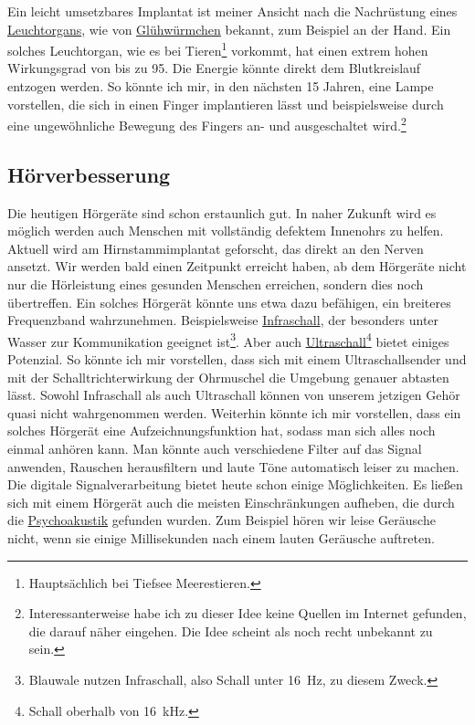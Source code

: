 Ein leicht umsetzbares Implantat ist meiner Ansicht nach die Nachrüstung eines
\href{http://de.wikipedia.org/wiki/Leuchtorgane}{Leuchtorgans}, wie von
\href{http://de.wikipedia.org/wiki/Leuchtkäfer}{Glühwürmchen} bekannt, zum Beispiel an der Hand. Ein
solches Leuchtorgan, wie es bei Tieren\footnote{Hauptsächlich bei Tiefsee Meerestieren.}
vorkommt, hat einen
extrem hohen Wirkungsgrad von bis zu 95\Prozent. Die Energie könnte direkt dem Blutkreislauf entzogen
werden. So könnte ich mir, in den nächsten 15 Jahren, eine Lampe
vorstellen, die sich in einen Finger implantieren lässt und beispielsweise durch eine ungewöhnliche
Bewegung des Fingers an- und ausgeschaltet wird.\footnote{Interessanterweise habe ich zu dieser Idee
keine Quellen im Internet gefunden, die darauf näher eingehen. Die Idee scheint als noch recht
unbekannt zu sein.}

\subsection{Hörverbesserung} %
\label{sec:Robin:future:hearing}
Die heutigen Hörgeräte sind schon erstaunlich gut.
In naher Zukunft wird es möglich werden auch Menschen mit vollständig defektem Innenohrs zu helfen.
Aktuell wird am Hirnstammimplantat geforscht, das direkt an den Nerven ansetzt.
Wir werden bald einen Zeitpunkt erreicht haben, ab dem Hörgeräte nicht nur die Hörleistung eines gesunden
Menschen erreichen, sondern dies noch übertreffen.
Ein solches Hörgerät könnte uns etwa dazu befähigen, ein breiteres Frequenzband
wahrzunehmen. Beispielsweise \href{http://de.wikipedia.org/wiki/Infraschall}{Infraschall}, der
besonders unter Wasser zur Kommunikation geeignet ist\footnote{Blauwale nutzen Infraschall, also
Schall unter \SI{16}{\hertz}, zu diesem Zweck.}. Aber auch
\href{http://de.wikipedia.org/wiki/Ultraschall}{Ultraschall}\footnote{Schall oberhalb von
\SI{16}{\kilo\hertz}.} bietet einiges Potenzial. So könnte ich mir vorstellen, dass sich mit einem
Ultraschallsender und mit der Schalltrichterwirkung der Ohrmuschel die Umgebung genauer abtasten
lässt. Sowohl Infraschall als auch Ultraschall können von unserem jetzigen Gehör quasi nicht
wahrgenommen werden. Weiterhin könnte ich mir vorstellen, dass ein solches Hörgerät eine
Aufzeichnungsfunktion hat, sodass man sich alles noch einmal anhören kann. Man könnte auch
verschiedene Filter auf das Signal anwenden, Rauschen herausfiltern und laute Töne automatisch leiser
zu machen. Die digitale Signalverarbeitung bietet heute schon einige Möglichkeiten.
Es ließen sich mit einem Hörgerät auch die meisten Einschränkungen aufheben, die durch die
\href{http://de.wikipedia.org/wiki/Psychoakustik}{Psychoakustik} gefunden wurden. Zum Beispiel hören
wir leise Geräusche nicht, wenn sie einige Millisekunden nach einem lauten Geräusche auftreten.


